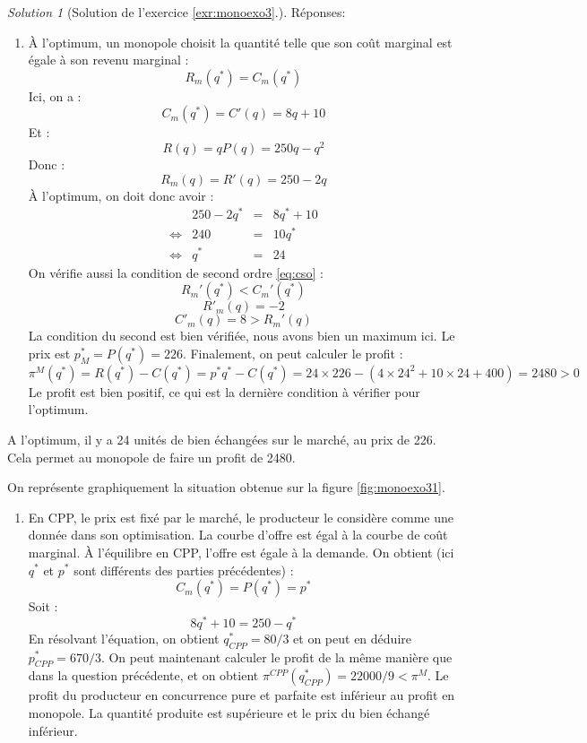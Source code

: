 \documentclass[
]{book}
\providecommand{\tightlist}{%
  \setlength{\itemsep}{0pt}\setlength{\parskip}{0pt}}
\theoremstyle{definition}
\theoremstyle{definition}
\theoremstyle{definition}
\theoremstyle{definition}
\theoremstyle{remark}
\newtheorem*{solution}{Solution}
\begin{document}
\begin{solution}[Solution de l'exercice  \ref{exr:monoexo3}.]

Réponses:

\begin{enumerate}
\def\labelenumi{\arabic{enumi}.}
\tightlist
\item
  À l'optimum, un monopole choisit la quantité telle que son coût marginal est égale à son revenu marginal :
  \[R_m(q^*)=C_m(q^*)\]
  Ici, on a :
  \[C_m(q^*)=C'(q)=8q+10\]
  Et :
  \[R(q) =qP(q)=250q-q^2\]
  Donc :
  \[R_m(q)=R'(q)=250-2q\]
  À l'optimum, on doit donc avoir :
  \[
  \begin{array}{crcl}
  &250-2q^*&=&8q^*+10\\
  \Leftrightarrow & 240&=&10q^*\\
  \Leftrightarrow & q^*&=&24
  \end{array}
  \]
  On vérifie aussi la condition de second ordre \eqref{eq:cso} :
  \[R_m'(q^*)<C_m'(q^*)\]
  \[R'_m(q)=-2\]
  \[C'_m(q)=8>R_m'(q)\]
  La condition du second est bien vérifiée, nous avons bien un maximum ici.
  Le prix est \(p^*_M=P(q^*)=226\).
  Finalement, on peut calculer le profit :
  \[
  \pi^M(q^*)=R(q^*)-C(q^*)=p^*q^*-C(q^*)=24\times226-(4\times24^2+10\times24+400)=2480>0
  \]
  Le profit est bien positif, ce qui est la dernière condition à vérifier pour l'optimum.
\end{enumerate}

A l'optimum, il y a 24 unités de bien échangées sur le marché, au prix de 226.
Cela permet au monopole de faire un profit de 2480.

On représente graphiquement la situation obtenue sur la figure \ref{fig:monoexo31}.

\begin{enumerate}
\def\labelenumi{\arabic{enumi}.}
\setcounter{enumi}{1}
\tightlist
\item
  En CPP, le prix est fixé par le marché, le producteur le considère comme une donnée dans son optimisation.
  La courbe d'offre est égal à la courbe de coût marginal.
  À l'équilibre en CPP, l'offre est égale à la demande.
  On obtient (ici \(q^*\) et \(p^*\) sont différents des parties précédentes) :
  \[C_m(q^*)=P(q^*)=p^*\]
  Soit :
  \[8q^*+10=250-q^*\]
  En résolvant l'équation, on obtient \(q^*_{CPP}=80/3\) et on peut en déduire \(p^*_{CPP}=670/3\).
  On peut maintenant calculer le profit de la même manière que dans la question précédente, et on obtient \(\pi^{CPP}(q^*_{CPP})=22000/9<\pi^M\).
  Le profit du producteur en concurrence pure et parfaite est inférieur au profit en monopole.
  La quantité produite est supérieure et le prix du bien échangé inférieur.
\end{enumerate}


\end{solution}
\end{document}
